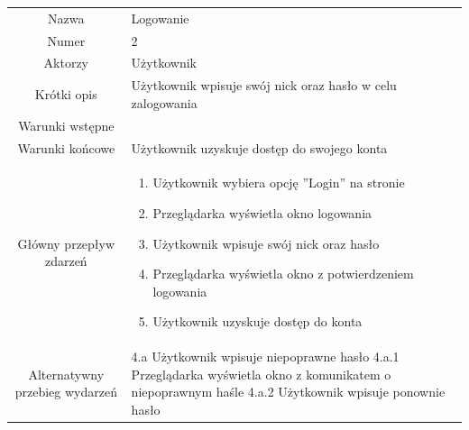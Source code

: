 \documentclass[a4paper]{article}
\begin{document}
\begin{tabular}{c p{10cm}}
Nazwa&	Logowanie\\
Numer	& 2\\
Aktorzy &	Użytkownik\\
Krótki opis &  Użytkownik wpisuje swój nick oraz hasło w celu zalogowania\\
Warunki wstępne&	\\
Warunki końcowe&	Użytkownik uzyskuje dostęp do swojego konta\\
Główny przepływ zdarzeń&
\begin{enumerate}
\item Użytkownik wybiera opcję ''Login'' na stronie
\item Przeglądarka wyświetla okno logowania
\item Użytkownik wpisuje swój nick oraz hasło
\item Przeglądarka wyświetla okno z potwierdzeniem logowania
\item Użytkownik uzyskuje dostęp do konta

\end{enumerate} \\
Alternatywny przebieg wydarzeń &
4.a Użytkownik wpisuje niepoprawne hasło \newline
4.a.1 Przeglądarka wyświetla okno z komunikatem o niepoprawnym haśle \newline
4.a.2 Użytkownik wpisuje ponownie hasło\newline
\\

\end{tabular}
\end{document}
